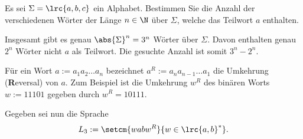 \begin{questions}

	Es sei $\Sigma = \lrc{a, b, c}$ ein Alphabet. Bestimmen Sie die Anzahl der verschiedenen Wörter der Länge $n\in\N$ über $\Sigma$, welche das Teilwort $a$ enthalten.
	\begin{solution}
		Insgesamt gibt es genau $\abs{\Sigma}^n = 3^n$ Wörter über $\Sigma$. Davon enthalten genau $2^n$ Wörter nicht $a$ als Teilwort. Die gesuchte Anzahl ist somit $3^n - 2^n$.
	\end{solution}
	\droptotalpoints
	\clearpage



	Für ein Wort $a := a_1a_2\ldots a_n$ bezeichnet $a^R := a_na_{n-1}\ldots a_1$ die Umkehrung (\textbf{R}eversal) von
	$a$. Zum Beispiel ist die Umkehrung $w^R$ des binären Worts $w := 11101$ gegeben durch $w^R = 10111$.

	Gegeben sei nun die Sprache
	\begin{align*}
		L_3 := \setcm{wabw^R}{w\in\lrc{a,b}^*}.
	\end{align*}
\end{questions}
